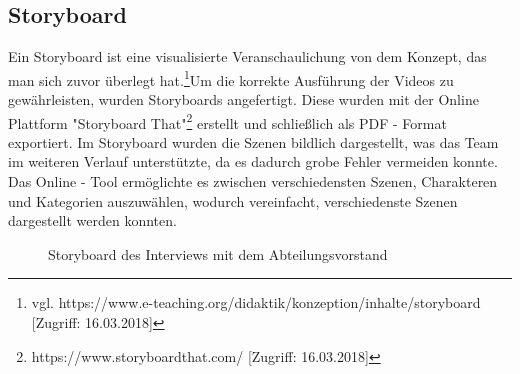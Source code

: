\subsection{Storyboard}
Ein Storyboard ist eine visualisierte Veranschaulichung von dem Konzept, das man sich zuvor überlegt hat.\footnote{\label{}vgl. https://www.e-teaching.org/didaktik/konzeption/inhalte/storyboard [Zugriff: 16.03.2018]}Um die korrekte Ausführung der Videos zu gewährleisten, wurden Storyboards angefertigt. Diese wurden mit der Online Plattform "Storyboard That"\footnote{\label{}https://www.storyboardthat.com/ [Zugriff: 16.03.2018]} erstellt und schließlich als PDF - Format exportiert.
Im Storyboard wurden die Szenen bildlich dargestellt, was das Team im weiteren Verlauf unterstützte, da es dadurch grobe Fehler vermeiden konnte.
Das Online - Tool ermöglichte es zwischen verschiedensten Szenen, Charakteren und Kategorien auszuwählen, wodurch vereinfacht, verschiedenste Szenen dargestellt werden konnten. 
\begin{figure}[H]
\begin{center}
	\caption{Storyboard des Interviews mit dem Abteilungsvorstand}
\end{center}
\end{figure}